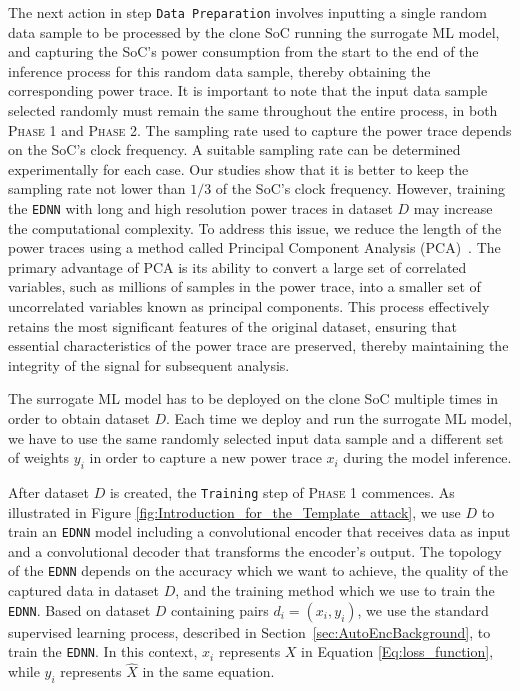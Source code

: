 \documentclass[letterpaper]{article}
\begin{document}
The next action in step \texttt{Data Preparation} involves inputting a single random data sample to be processed by the clone SoC running the surrogate ML model, and capturing the SoC's power consumption from the start to the end of the inference process for this random data sample, thereby obtaining the corresponding power trace. It is important to note that the input data sample selected randomly must remain the same throughout the entire process, in both \textsc{Phase 1} and \textsc{Phase 2}. The sampling rate used to capture the power trace depends on the SoC's clock frequency. A suitable sampling rate can be determined experimentally for each case. Our studies show that it is better to keep the sampling rate not lower than $1/3$ of the SoC's clock frequency. However, training the \texttt{EDNN} with long and high resolution power traces in dataset $D$ may increase the computational complexity. To address this issue, we reduce the length of the power traces using a method called Principal Component Analysis (PCA)~\cite{tharwat2016principal}. The primary advantage of PCA is its ability to convert a large set of correlated variables, such as millions of samples in the power trace, into a smaller set of uncorrelated variables known as principal components. This process effectively retains the most significant features of the original dataset, ensuring that essential characteristics of the power trace are preserved, thereby maintaining the integrity of the signal for subsequent analysis.

 The surrogate ML model has to be deployed on the clone SoC multiple times in order to obtain dataset $D$. Each time we deploy and run the surrogate ML model, we have to use the same randomly selected input data sample and a different set of weights $y_i$ in order to capture a new power trace $x_i$ during the model inference.

After dataset $D$ is created, the \texttt{Training} step of \textsc{Phase 1} commences. As illustrated in Figure \ref{fig:Introduction_for_the_Template_attack}, we use $D$ to train an \texttt{EDNN} model including a convolutional encoder that receives data as input and a convolutional decoder that transforms the encoder's output. The topology of the \texttt{EDNN} depends on the accuracy which we want to achieve, the quality of the captured data in dataset $D$, and the training method which we use to train the \texttt{EDNN}. Based on dataset $D$ containing pairs $d_i = (x_i, y_i)$, we use the standard supervised learning process, described in Section~\ref{sec:AutoEncBackground}, to train the \texttt{EDNN}. In this context, $x_i$ represents $X$ in Equation \ref{Eq:loss_function}, while $y_i$ represents $\hat{X}$ in the same equation.
\end{document}
